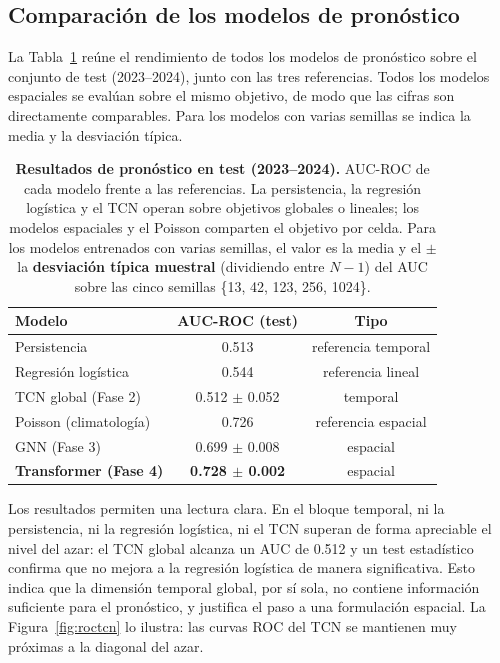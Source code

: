 \subsection{Comparación de los modelos de pronóstico}
\label{res-comparativa}

La Tabla~\ref{tab:comparativa} reúne el rendimiento de todos los modelos de pronóstico sobre el
conjunto de test (2023--2024), junto con las tres referencias. Todos los modelos espaciales se
evalúan sobre el mismo objetivo, de modo que las cifras son directamente comparables. Para los
modelos con varias semillas se indica la media y la desviación típica.

\begin{table}[ht!]
  \centering
  \small
  \begin{tabular}{@{}lcc@{}}
    \toprule
    \textbf{Modelo}               & \textbf{AUC-ROC (test)}    & \textbf{Tipo}       \\
    \midrule
    Persistencia                  & 0.513                      & referencia temporal \\
    Regresión logística           & 0.544                      & referencia lineal   \\
    TCN global (Fase 2)           & 0.512 $\pm$ 0.052          & temporal            \\
    \midrule
    Poisson (climatología)        & 0.726                      & referencia espacial \\
    GNN (Fase 3)                  & 0.699 $\pm$ 0.008          & espacial            \\
    \textbf{Transformer (Fase 4)} & \textbf{0.728 $\pm$ 0.002} & espacial            \\
    \bottomrule
  \end{tabular}
  \caption[Comparativa de los modelos de pronóstico frente a las referencias]{\textbf{Resultados de pronóstico en test (2023--2024).} AUC-ROC de cada modelo frente a las referencias. La persistencia, la regresión logística y el TCN operan sobre objetivos globales o lineales; los modelos espaciales y el Poisson comparten el objetivo por celda. Para los modelos entrenados con varias semillas, el valor es la media y el \(\pm\) la \textbf{desviación típica muestral} (dividiendo entre \(N-1\)) del AUC sobre las cinco semillas \{13, 42, 123, 256, 1024\}.}
  \label{tab:comparativa}
\end{table}

Los resultados permiten una lectura clara. En el bloque temporal, ni la persistencia, ni la
regresión logística, ni el TCN superan de forma apreciable el nivel del azar: el TCN global
alcanza un AUC de 0.512 y un test estadístico confirma que no mejora a la regresión logística
de manera significativa. Esto indica que la dimensión temporal global, por sí sola, no contiene
información suficiente para el pronóstico, y justifica el paso a una formulación espacial. La
Figura~\ref{fig:roctcn} lo ilustra: las curvas ROC del TCN se mantienen muy próximas a la
diagonal del azar.

